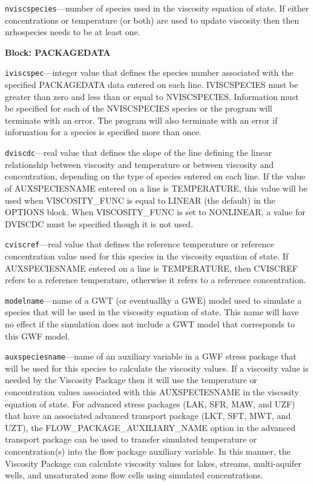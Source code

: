 \begin{description}
\item \texttt{nviscspecies}---number of species used in the viscosity equation of state.  If either concentrations or temperature (or both) are used to update viscosity then then nrhospecies needs to be at least one.

\end{description}
\item \textbf{Block: PACKAGEDATA}

\begin{description}
\item \texttt{iviscspec}---integer value that defines the species number associated with the specified PACKAGEDATA data entered on each line. IVISCSPECIES must be greater than zero and less than or equal to NVISCSPECIES. Information must be specified for each of the NVISCSPECIES species or the program will terminate with an error.  The program will also terminate with an error if information for a species is specified more than once.

\item \texttt{dviscdc}---real value that defines the slope of the line defining the linear relationship between viscosity and temperature or between viscosity and concentration, depending on the type of species entered on each line.  If the value of AUXSPECIESNAME entered on a line is TEMPERATURE, this value will be used when VISCOSITY_FUNC is equal to LINEAR (the default) in the OPTIONS block.  When VISCOSITY_FUNC is set to NONLINEAR, a value for DVISCDC must be specified though it is not used.

\item \texttt{cviscref}---real value that defines the reference temperature or reference concentration value used for this species in the viscosity equation of state.  If AUXSPECIESNAME entered on a line is TEMPERATURE, then CVISCREF refers to a reference temperature, otherwise it refers to a reference concentration.

\item \texttt{modelname}---name of a GWT (or eventuallky a GWE) model used to simulate a species that will be used in the viscosity equation of state.  This name will have no effect if the simulation does not include a GWT model that corresponds to this GWF model.

\item \texttt{auxspeciesname}---name of an auxiliary variable in a GWF stress package that will be used for this species to calculate the viscosity values.  If a viscosity value is needed by the Viscosity Package then it will use the temperature or concentration values associated with this AUXSPECIESNAME in the viscosity equation of state.  For advanced stress packages (LAK, SFR, MAW, and UZF) that have an associated advanced transport package (LKT, SFT, MWT, and UZT), the FLOW\_PACKAGE\_AUXILIARY\_NAME option in the advanced transport package can be used to transfer simulated temperature or concentration(s) into the flow package auxiliary variable.  In this manner, the Viscosity Package can calculate viscosity values for lakes, streams, multi-aquifer wells, and unsaturated zone flow cells using simulated concentrations.

\end{description}

